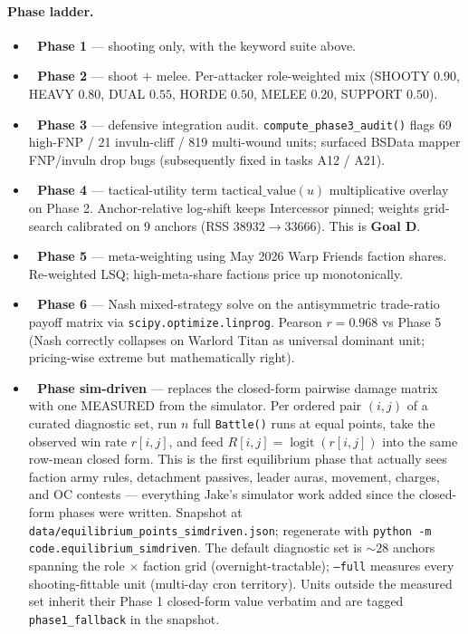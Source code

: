 \documentclass[11pt,a4paper]{article}
\newcommand{\done}{\ding{51}\,}     %
\begin{document}
\paragraph{Phase ladder.}
\begin{itemize}[itemsep=2pt]
  \item \done\ \textbf{Phase 1} --- shooting only, with the keyword
    suite above.
  \item \done\ \textbf{Phase 2} --- shoot $+$ melee. Per-attacker
    role-weighted mix (SHOOTY $0.90$, HEAVY $0.80$, DUAL $0.55$,
    HORDE $0.50$, MELEE $0.20$, SUPPORT $0.50$).
  \item \done\ \textbf{Phase 3} --- defensive integration audit.
    \texttt{compute\_phase3\_audit()} flags 69 high-FNP / 21 invuln-cliff
    / 819 multi-wound units; surfaced BSData mapper FNP/invuln drop bugs
    (subsequently fixed in tasks A12 / A21).
  \item \done\ \textbf{Phase 4} --- tactical-utility term
    $\text{tactical\_value}(u)$ multiplicative overlay on Phase 2.
    Anchor-relative log-shift keeps Intercessor pinned; weights grid-
    search calibrated on 9 anchors (RSS $38932 \to 33666$). This is
    \textbf{Goal D}.
  \item \done\ \textbf{Phase 5} --- meta-weighting using May 2026 Warp
    Friends faction shares. Re-weighted LSQ; high-meta-share factions
    price up monotonically.
  \item \done\ \textbf{Phase 6} --- Nash mixed-strategy solve on the
    antisymmetric trade-ratio payoff matrix via
    \texttt{scipy.optimize.linprog}. Pearson $r=0.968$ vs Phase 5 (Nash
    correctly collapses on Warlord Titan as universal dominant unit;
    pricing-wise extreme but mathematically right).
  \item \done\ \textbf{Phase sim-driven} --- replaces the closed-form
    pairwise damage matrix with one MEASURED from the simulator. Per
    ordered pair $(i, j)$ of a curated diagnostic set, run $n$ full
    \texttt{Battle()} runs at equal points, take the observed win rate
    $r[i,j]$, and feed $R[i,j] = \operatorname{logit}(r[i,j])$ into the
    same row-mean closed form. This is the first equilibrium phase that
    actually sees faction army rules, detachment passives, leader auras,
    movement, charges, and OC contests --- everything Jake's simulator
    work added since the closed-form phases were written. Snapshot at
    \texttt{data/equilibrium\_points\_simdriven.json}; regenerate with
    \texttt{python -m code.equilibrium\_simdriven}. The default
    diagnostic set is ${\sim}28$ anchors spanning the role $\times$
    faction grid (overnight-tractable); \texttt{--full} measures every
    shooting-fittable unit (multi-day cron territory). Units outside the
    measured set inherit their Phase 1 closed-form value verbatim and
    are tagged \texttt{phase1\_fallback} in the snapshot.
\end{itemize}
\end{document}
